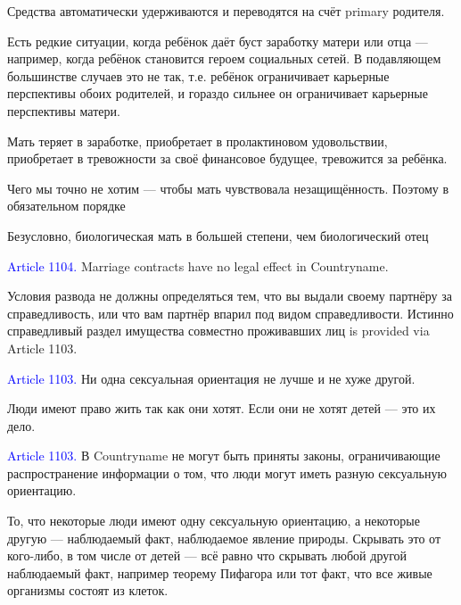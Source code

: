 \documentclass[11pt]{article}
\theoremstyle{remark}
\theoremstyle{definition}
\begin{document}
Средства автоматически удерживаются и переводятся на счёт primary родителя.


Есть редкие ситуации, когда ребёнок даёт буст заработку матери или отца --- например, когда ребёнок становится героем социальных сетей. В подавляющем большинстве случаев это не так, т.е. ребёнок ограничивает карьерные перспективы обоих родителей, и гораздо сильнее он ограничивает карьерные перспективы матери. 

Мать теряет в заработке, приобретает в пролактиновом удовольствии, приобретает в тревожности за своё финансовое будущее, тревожится за ребёнка.








Чего мы точно не хотим --- чтобы мать чувствовала незащищённость. Поэтому в обязательном порядке


Безусловно, биологическая мать в большей степени, чем биологический отец



\color{black}









\textcolor{blue}{Article 1104.} Marriage contracts have no legal effect in Countryname.

\color{blue}

Условия развода не должны определяться тем, что вы выдали своему партнёру за справедливость, или что вам партнёр впарил под видом справедливости. Истинно справедливый раздел имущества совместно проживавших лиц is provided via Article 1103. 







\color{black}


\textcolor{blue}{Article 1103.} Ни одна сексуальная ориентация не лучше и не хуже другой.

\color{blue}

Люди имеют право жить так как они хотят. Если они не хотят детей --- это их дело.


\color{black}

\textcolor{blue}{Article 1103.} В Countryname не могут быть приняты законы, ограничивающие распространение информации о том, что люди могут иметь разную сексуальную ориентацию.

\color{blue}

То, что некоторые люди имеют одну сексуальную ориентацию, а некоторые другую --- наблюдаемый факт, наблюдаемое явление природы. Скрывать это от кого-либо, в том числе от детей --- всё равно что скрывать любой другой наблюдаемый факт, например теорему Пифагора или тот факт, что все живые организмы состоят из клеток. 
\end{document}
